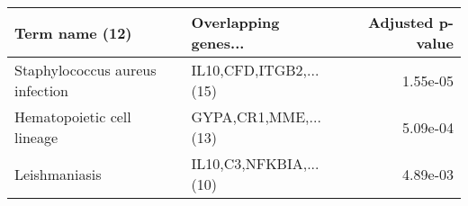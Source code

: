 \begin{tabular}{llr}
\toprule
                 Term name (12) &   Overlapping genes... &  Adjusted p-value \\
\midrule
Staphylococcus aureus infection & IL10,CFD,ITGB2,...(15) &          1.55e-05 \\
     Hematopoietic cell lineage &   GYPA,CR1,MME,...(13) &          5.09e-04 \\
                  Leishmaniasis & IL10,C3,NFKBIA,...(10) &          4.89e-03 \\
\bottomrule
\end{tabular}
